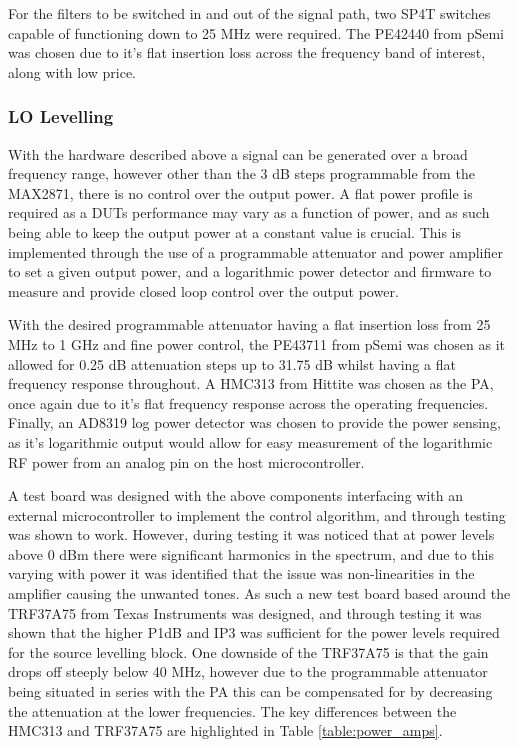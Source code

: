 For the filters to be switched in and out of the signal path, two SP4T switches capable of functioning down to 25 MHz were required. The PE42440 from pSemi was chosen due to it's flat insertion loss across the frequency band of interest, along with low price. 

\subsubsection{LO Levelling}
With the hardware described above a signal can be generated over a broad frequency range, however other than the 3 dB steps programmable from the MAX2871, there is no control over the output power. A flat power profile is required as a DUTs performance may vary as a function of power, and as such being able to keep the output power at a constant value is crucial. This is implemented through the use of a programmable attenuator and power amplifier to set a given output power, and a logarithmic power detector and firmware to measure and provide closed loop control over the output power. 

With the desired programmable attenuator having a flat insertion loss from 25 MHz to 1 GHz and fine power control, the PE43711 from pSemi was chosen as it allowed for 0.25 dB attenuation steps up to 31.75 dB whilst having a flat frequency response throughout. A HMC313 from Hittite was chosen as the PA, once again due to it's flat frequency response across the operating frequencies. Finally, an AD8319 log power detector was chosen to provide the power sensing, as it's logarithmic output would allow for easy measurement of the logarithmic RF power from an analog pin on the host microcontroller. 

A test board was designed with the above components interfacing with an external microcontroller to implement the control algorithm, and through testing was shown to work. However, during testing it was noticed that at power levels above 0 dBm there were significant harmonics in the spectrum, and due to this varying with power it was identified that the issue was non-linearities in the amplifier causing the unwanted tones. As such a new test board based around the TRF37A75 from Texas Instruments was designed, and through testing it was shown that the higher P1dB and IP3 was sufficient for the power levels required for the source levelling block. One downside of the TRF37A75 is that the gain drops off steeply below 40 MHz, however due to the programmable attenuator being situated in series with the PA this can be compensated for by decreasing the attenuation at the lower frequencies. The key differences between the HMC313 and TRF37A75 are highlighted in Table \ref{table:power_amps}.

